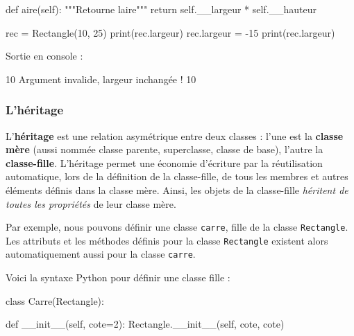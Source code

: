 \documentclass[
  a4paper,
  DIV=11,
  numbers=noendperiod]{scrartcl}
\newenvironment{Shaded}{\begin{snugshade}}{\end{snugshade}}
\newcommand{\BuiltInTok}[1]{\textcolor[rgb]{0.00,0.23,0.31}{#1}}
\newcommand{\CommentTok}[1]{\textcolor[rgb]{0.37,0.37,0.37}{#1}}
\newcommand{\ControlFlowTok}[1]{\textcolor[rgb]{0.00,0.23,0.31}{#1}}
\newcommand{\DecValTok}[1]{\textcolor[rgb]{0.68,0.00,0.00}{#1}}
\newcommand{\FunctionTok}[1]{\textcolor[rgb]{0.28,0.35,0.67}{#1}}
\newcommand{\KeywordTok}[1]{\textcolor[rgb]{0.00,0.23,0.31}{#1}}
\newcommand{\NormalTok}[1]{\textcolor[rgb]{0.00,0.23,0.31}{#1}}
\newcommand{\OperatorTok}[1]{\textcolor[rgb]{0.37,0.37,0.37}{#1}}
\newcommand{\VariableTok}[1]{\textcolor[rgb]{0.07,0.07,0.07}{#1}}
\begin{document}
\begin{Shaded}
\begin{Highlighting}[]
    \KeywordTok{def}\NormalTok{ aire(}\VariableTok{self}\NormalTok{):}
        \CommentTok{"""Retourne l\textquotesingle{}aire"""}
        \ControlFlowTok{return} \VariableTok{self}\NormalTok{.\_\_largeur }\OperatorTok{*} \VariableTok{self}\NormalTok{.\_\_hauteur}


\NormalTok{rec }\OperatorTok{=}\NormalTok{ Rectangle(}\DecValTok{10}\NormalTok{, }\DecValTok{25}\NormalTok{)}
\BuiltInTok{print}\NormalTok{(rec.largeur)}
\NormalTok{rec.largeur }\OperatorTok{=} \OperatorTok{{-}}\DecValTok{15}
\BuiltInTok{print}\NormalTok{(rec.largeur)}
\end{Highlighting}
\end{Shaded}

Sortie en console :

\begin{Shaded}
\begin{Highlighting}[]
\DecValTok{10}
\NormalTok{Argument invalide, largeur inchangée }\OperatorTok{!}
\DecValTok{10}
\end{Highlighting}
\end{Shaded}

\hypertarget{lhuxe9ritage}{%
\subsubsection{L'héritage}\label{lhuxe9ritage}}

L'\textbf{héritage} est une relation asymétrique entre deux classes :
l'une est la \textbf{classe mère} (aussi nommée classe parente,
superclasse, classe de base), l'autre la \textbf{classe-fille}.
L'héritage permet une économie d'écriture par la réutilisation
automatique, lors de la définition de la classe-fille, de tous les
membres et autres éléments définis dans la classe mère. Ainsi, les
objets de la classe-fille \emph{héritent de toutes les propriétés} de
leur classe mère.

Par exemple, nous pouvons définir une classe \texttt{carre}, fille de la
classe \texttt{Rectangle}. Les attributs et les méthodes définis pour la
classe \texttt{Rectangle} existent alors automatiquement aussi pour la
classe \texttt{carre}.

Voici la syntaxe Python pour définir une classe fille :

\begin{Shaded}
\begin{Highlighting}[]
\KeywordTok{class}\NormalTok{ Carre(Rectangle):}

    \KeywordTok{def} \FunctionTok{\_\_init\_\_}\NormalTok{(}\VariableTok{self}\NormalTok{, cote}\OperatorTok{=}\DecValTok{2}\NormalTok{):}
\NormalTok{        Rectangle.}\FunctionTok{\_\_init\_\_}\NormalTok{(}\VariableTok{self}\NormalTok{, cote, cote)}
\end{Highlighting}
\end{Shaded}
\end{document}

